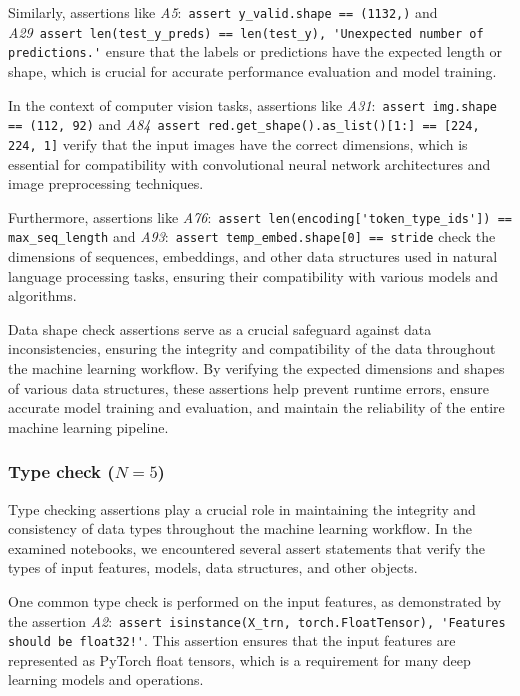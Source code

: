 Similarly, assertions like \emph{A5}:~\lstinline{assert y_valid.shape == (1132,)} and \emph{A29}~\lstinline{assert len(test_y_preds) == len(test_y), 'Unexpected number of predictions.'} ensure that the labels or predictions have the expected length or shape, which is crucial for accurate performance evaluation and model training.

In the context of computer vision tasks, assertions like \emph{A31}:~\lstinline{assert img.shape == (112, 92)} and \emph{A84}~\lstinline{assert red.get_shape().as_list()[1:] == [224, 224, 1]} verify that the input images have the correct dimensions, which is essential for compatibility with convolutional neural network architectures and image preprocessing techniques.

Furthermore, assertions like \emph{A76}:~\lstinline{assert len(encoding['token_type_ids']) == max_seq_length} and \emph{A93}:~\lstinline{assert temp_embed.shape[0] == stride} check the dimensions of sequences, embeddings, and other data structures used in natural language processing tasks, ensuring their compatibility with various models and algorithms.

Data shape check assertions serve as a crucial safeguard against data inconsistencies, ensuring the integrity and compatibility of the data throughout the machine learning workflow. By verifying the expected dimensions and shapes of various data structures, these assertions help prevent runtime errors, ensure accurate model training and evaluation, and maintain the reliability of the entire machine learning pipeline.

\subsubsection{Type check ($N = 5$)}

Type checking assertions play a crucial role in maintaining the integrity and consistency of data types throughout the machine learning workflow. In the examined notebooks, we encountered several assert statements that verify the types of input features, models, data structures, and other objects.

One common type check is performed on the input features, as demonstrated by the assertion \emph{A2}:~\lstinline{assert isinstance(X_trn, torch.FloatTensor), 'Features should be float32!'}. This assertion ensures that the input features are represented as PyTorch float tensors, which is a requirement for many deep learning models and operations.

